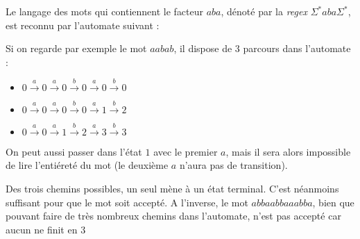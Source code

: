 \begin{example}
\label{exnondet1}
Le langage des mots qui contiennent le facteur $aba$, dénoté par la \textit{regex} $\Sigma^*aba\Sigma^*$, est reconnu par l'automate suivant :

\begin{figure}[!ht]
\centering
{}
\end{figure}

Si on regarde par exemple le mot $aabab$, il dispose de 3 parcours dans l'automate : 

\begin{itemize}
\item $0 \xrightarrow{a} 0 \xrightarrow{a} 0 \xrightarrow{b} 0 \xrightarrow{a} 0 \xrightarrow{b} 0$
\item $0 \xrightarrow{a} 0 \xrightarrow{a} 0 \xrightarrow{b} 0 \xrightarrow{a} 1 \xrightarrow{b} 2$
\item $0 \xrightarrow{a} 0 \xrightarrow{a} 1 \xrightarrow{b} 2 \xrightarrow{a} 3 \xrightarrow{b} 3$
\end{itemize}

On peut aussi passer dans l'état $1$ avec le premier $a$, mais il sera alors impossible de lire l'entiéreté du mot (le deuxième $a$ n'aura pas de transition).

Des trois chemins possibles, un seul mène à un état terminal. C'est néanmoins suffisant pour que le mot soit accepté. A l'inverse, le mot $abbaabbaaabba$, bien que pouvant faire de très nombreux chemins dans l'automate, n'est pas accepté car aucun ne finit en $3$
\end{example}

